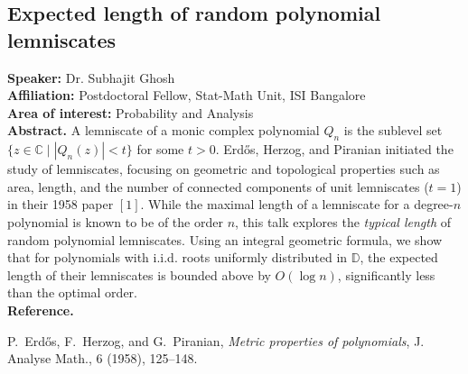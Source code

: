 \subsection*{Expected length of random polynomial lemniscates} %
\noindent
\textbf{Speaker:} Dr. Subhajit Ghosh \\ %
\textbf{Affiliation:} Postdoctoral Fellow, Stat-Math Unit, ISI Bangalore \\ %
\textbf{Area of interest:} Probability and Analysis\\

\noindent\textbf{Abstract.}  A lemniscate of a monic complex polynomial \( Q_n \) is the sublevel set \( \{z \in \mathbb{C} \mid |Q_n(z)| < t\} \) for some \( t > 0 \). Erdős, Herzog, and Piranian initiated the study of lemniscates, focusing on geometric and topological properties such as area, length, and the number of connected components of unit lemniscates (\( t = 1 \)) in their 1958 paper $[1]$. While the maximal length of a lemniscate for a degree-\( n \) polynomial is known to be of the order \( n \), this talk explores the \emph{typical length} of random polynomial lemniscates. Using an integral geometric formula, we show that for polynomials with i.i.d. roots uniformly distributed in \( \mathbb{D} \), the expected length of their lemniscates is bounded above by \( O(\log n) \), significantly less than the optimal order.
\\

\noindent \textbf{Reference.}
\begin{enumerate}[label={[}\arabic*{]}\setlength{\labelsep}{0.5em}, left=0pt, itemsep=0pt]
    \item P.~Erd\H{o}s, F.~Herzog, and G.~Piranian, \textit{Metric properties of polynomials}, J. Analyse Math., 6 (1958), 125--148.
\end{enumerate}
